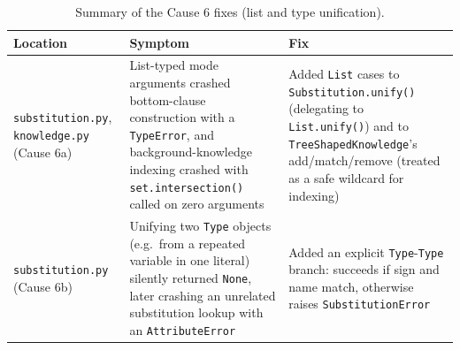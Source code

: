 \begin{table}[h]
\centering
\begin{tabular}{@{}p{3cm}p{5cm}p{5cm}@{}}
\toprule
Location & Symptom & Fix \\
\midrule
\texttt{substitution.py}, \texttt{knowledge.py} (Cause 6a) &
List-typed mode arguments crashed bottom-clause construction with a
\texttt{TypeError}, and background-knowledge indexing crashed with
\texttt{set.intersection()} called on zero arguments &
Added \texttt{List} cases to \texttt{Substitution.unify()} (delegating
to \texttt{List.unify()}) and to \texttt{TreeShapedKnowledge}'s
add/match/remove (treated as a safe wildcard for indexing) \\
\addlinespace
\texttt{substitution.py} (Cause 6b) &
Unifying two \texttt{Type} objects (e.g.\ from a repeated variable in
one literal) silently returned \texttt{None}, later crashing an
unrelated substitution lookup with an \texttt{AttributeError} &
Added an explicit \texttt{Type}-\texttt{Type} branch: succeeds if sign
and name match, otherwise raises \texttt{SubstitutionError} \\
\bottomrule
\end{tabular}
\caption{Summary of the Cause 6 fixes (list and type unification).}
\end{table}

